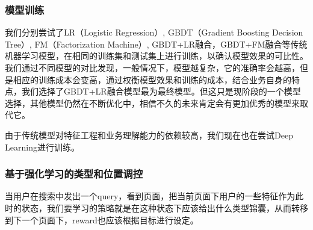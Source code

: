 \subsubsection{模型训练}
我们分别尝试了LR（Logistic Regression）, GBDT（Gradient Boosting Decision Tree）, FM（Factorization Machine）, GBDT+LR融合，GBDT+FM融合等传统机器学习模型，在相同的训练集和测试集上进行训练，以确认模型效果的可比性。我们通过不同模型的对比发现，一般情况下，模型越复杂，它的准确率会越高，但是相应的训练成本会变高，通过权衡模型效果和训练的成本，结合业务自身的特点，我们选择了GBDT+LR融合模型最为最终模型。但这只是现阶段的一个模型选择，其他模型仍然在不断优化中，相信不久的未来肯定会有更加优秀的模型来取代它。
\par 由于传统模型对特征工程和业务理解能力的依赖较高，我们现在也在尝试Deep Learning进行训练。

\subsubsection{基于强化学习的类型和位置调控}
当用户在搜索中发出一个query，看到页面，把当前页面下用户的一些特征作为此时的状态，我们要学习的策略就是在这种状态下应该给出什么类型锦囊，从而转移到下一个页面下，reward也应该根据目标进行设定。 
